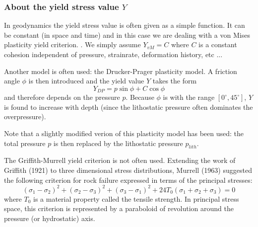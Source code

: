 \subsubsection{About the yield stress value $Y$}

In geodynamics the yield stress value is often given as a simple function. 
It can be constant (in space and time) and in this case we are dealing with a von Mises plasticity yield criterion. 
. We simply assume $Y_{vM}=C$ where $C$ is a constant cohesion independent of pressure, strainrate,
deformation history, etc ... 

Another model is often used: the Drucker-Prager plasticity model. 
A friction angle $\phi$ is then introduced and the yield value $Y$ takes the form
\[
Y_{DP}=p \sin\phi + C \cos \phi
\]
and therefore depends on the pressure $p$. Because $\phi$ is with the range $[0^\circ,45^\circ]$, $Y$ is
found to increase with depth (since the lithostatic pressure often dominates the overpressure).

Note that a slightly modified verion of this plasticity model has been used: the total pressure $p$
is then replaced by the lithostatic pressure $p_{lith}$.




The Griffith-Murrell yield criterion \cite{brau94} is not often used. 
Extending the work of Griffith (1921) to three dimensional stress distributions, 
Murrell (1963) suggested the following criterion for rock failure expressed 
in terms of the principal stresses:
\[
(\sigma_1-\sigma_2)^2 + (\sigma_2-\sigma_3)^2 + (\sigma_3-\sigma_1)^2
+
24T_0 (\sigma_1+\sigma_2+\sigma_3)=0
\]
where $T_0$ is a material property called the tensile strength. In principal stress space, 
this criterion is represented by a paraboloid of revolution around the pressure (or hydrostatic) axis.








